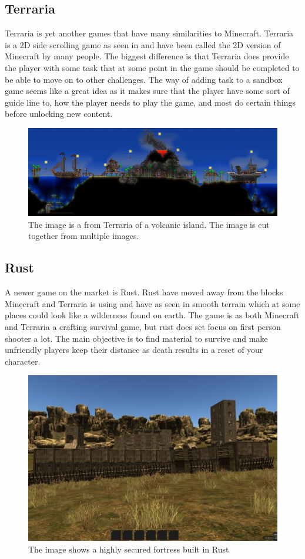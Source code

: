 \subsection{Terraria}

Terraria\cite{Terraria} is yet another games that have many similarities to Minecraft. Terraria is a 2D side scrolling game as seen in  and have been called the 2D version of Minecraft by many people. The biggest difference is that Terraria does provide the player with some task that at some point in the game should be completed to be able to move on to other challenges. The way of adding task to a sandbox game seems like a great idea as it makes sure that the player have some sort of guide line to, how the player needs to play the game, and most do certain things before unlocking new content.


\begin{figure}[H]
	\includegraphics[width=0.7\linewidth]{img/Terraria}
	\centering
	\caption{The image is a from Terraria of a volcanic island. The image is cut together from multiple images.}
	\label{fig:Terraria}
\end{figure}

\subsection{Rust}

A newer game on the market is Rust\cite{Rust}. Rust have moved away from the blocks Minecraft and Terraria is using and have as seen in smooth terrain which at some places could look like a wilderness found on earth. The game is as both Minecraft and Terraria a crafting survival game, but rust does set focus on first person shooter a lot. The main objective is to find material to survive and make unfriendly players keep their distance as death results in a reset of your character.


\begin{figure}[H]
	\includegraphics[width=0.7\linewidth]{img/Rust}
	\centering
	\caption{The image shows a highly secured fortress built in Rust}
	\label{fig:Rust}
\end{figure}


